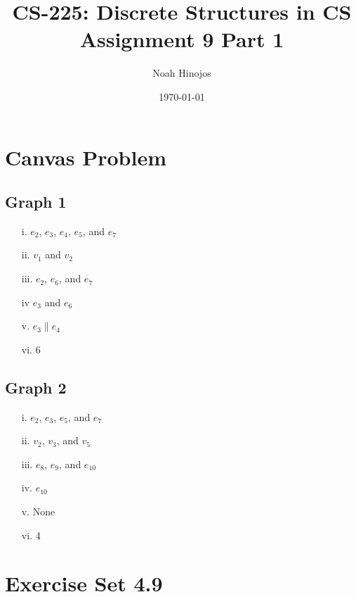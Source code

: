 \documentclass[12pt]{article}
\title{
  \textbf{CS-225: Discrete Structures in CS} \\
  Assignment 9 Part 1
  }
\author{Noah Hinojos}
\date{\today}
\begin{document}
\maketitle
\section*{Canvas Problem}
\subsection*{Graph 1}
\begin{itemize}
  \item [i.] $e_2$, $e_3$, $e_4$, $e_5$, and $e_7$
  \item [ii.] $v_1$ and $v_2$
  \item [iii.] $e_2$, $e_6$, and $e_7$
  \item [iv] $e_3$ and $e_6$
  \item [v.] $e_3 \parallel e_4$
  \item [vi.] 6
\end{itemize}\subsection*{Graph 2}
\begin{itemize}
  \item [i.]  $e_2$, $e_3$, $e_5$, and $e_7$
  \item [ii.] $v_2$, $v_3$, and $v_5$
  \item [iii.] $e_8$, $e_9$, and $e_{10}$
  \item [iv.] $e_{10}$
  \item [v.] None
  \item [vi.] 4
\end{itemize}
\section*{Exercise Set 4.9}
\end{document}
